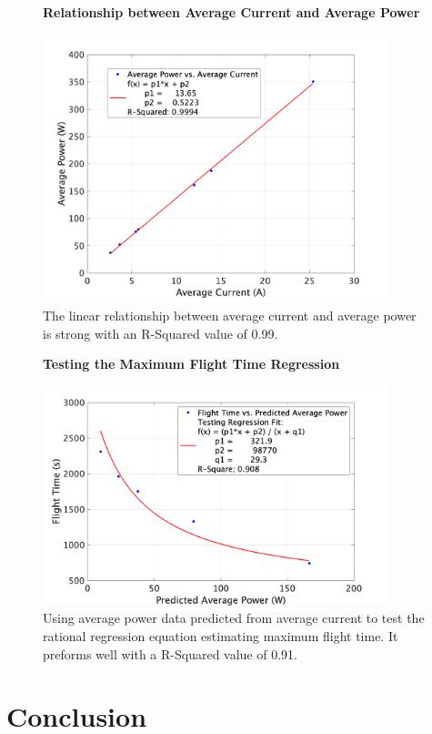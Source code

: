 \documentclass{article}
\begin{document}
\begin{figure}
  \centering
  \large{\textbf{Relationship between Average Current and Average Power}}\par
  \includegraphics[width = 100mm]{images/CurrToPwr.png}
  \caption{The linear relationship between average current and average power is strong with an R-Squared value of 0.99.}
  \label{fig:currtopwr}
\end{figure}

\begin{figure}
  \centering
  \large{\textbf{Testing the Maximum Flight Time Regression}}\par
  \includegraphics[width = 100mm]{images/UsingPredictedPower.png}
  \caption{Using average power data predicted from average current to test the rational regression equation estimating maximum flight time. It preforms well with a R-Squared value of 0.91.}
  \label{fig:usingpredictedpower}
\end{figure}



\section{Conclusion}
\end{document}
